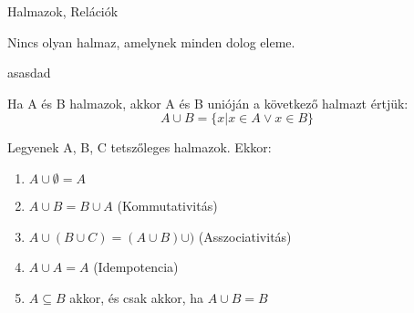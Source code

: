 
\begin{frame}[plain]
\begin{tcolorbox}[center, colback={myyellow}, coltext={black}, colframe={myyellow}]
    {\Huge Halmazok, Relációk}
    \mmedskip
\end{tcolorbox}
\end{frame}

\begin{frame}

\begin{tcolorbox}[title={Tétel: Minden dolog halmaza}]
Nincs olyan halmaz, amelynek minden dolog eleme.
\end{tcolorbox}

\begin{tcolorbox}[title={Biz}]
asasdad
\end{tcolorbox}

\end{frame}

\begin{frame}

\begin{tcolorbox}[title={Definíció: Unió}]
Ha A és B halmazok, akkor A és B unióján a következő halmazt értjük:\\
$$A \cup B = \{x | x \in A \vee x \in B\}$$
\end{tcolorbox}

\begin{tcolorbox}[title={Tétel: Az unió tulajdonságai}]
Legyenek A, B, C tetszőleges halmazok. Ekkor:

\begin{enumerate}
\item $A \cup \emptyset = A$
\item $A \cup B = B \cup A$ (Kommutativitás)
\item $A \cup (B \cup C) = (A \cup B) \cup )$ (Asszociativitás)
\item $A \cup A = A$ (Idempotencia)
\item $A \subseteq B$ akkor, és csak akkor, ha $A \cup B = B$
\end{enumerate}

\end{tcolorbox}

\end{frame}

